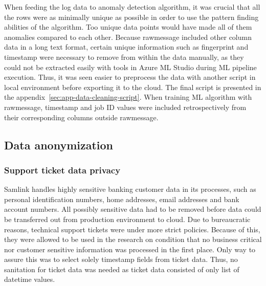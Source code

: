 When feeding the log data to anomaly detection algorithm,
it was crucial that all the rows were as minimally unique as possible
in order to use the pattern finding abilities of the algorithm.
Too unique data points would have made all of them anomalies
compared to each other.
Because rawmessage included other column data in a long text format,
certain unique information such as fingerprint and timestamp
were necessary to remove from within the data manually,
as they could not be extracted easily
with tools in Azure ML Studio
during ML pipeline execution.
Thus,
it was seen easier to preprocess the data
with another script in local environment
before exporting it to the cloud.
The final script is presented in the appendix~\ref{sec:app-data-cleaning-script}.
When training ML algorithm with rawmessage,
timestamp and job ID values were included retrospectively
from their corresponding columns outside rawmessage.



\subsection{Data anonymization}\label{subsec:meth-data-anonymization}

\subsubsection*{Support ticket data privacy}
Samlink handles highly sensitive banking customer data in its processes,
such as personal identification numbers, home addresses, email addresses and bank account numbers.
All possibly sensitive data had to be removed
before data could be transferred out from production environment to cloud.
Due to bureaucratic reasons,
technical support tickets were under more strict policies.
Because of this,
they were allowed to be used in the research
on condition that no business critical nor customer sensitive information
was processed in the first place.
Only way to assure this
was to select solely timestamp fields from ticket data.
Thus, no sanitation for ticket data was needed
as ticket data consisted of only list of datetime values.


